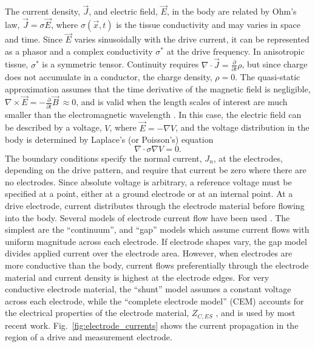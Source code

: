 \documentclass[12pt]{article} \usepackage[margin=3cm]{geometry} \usepackage[margin=20pt,font=small,labelfont=bf]{caption}\def\TBLWIDA{35mm}\def\TBLWIDB{95mm}
\newcommand\Fref[1]{Fig.\ \ref{#1}}
\newcommand{\JV}{\vec{J}}
\newcommand{\EV}{\vec{E}}
\newcommand{\BV}{\vec{B}}
\newcommand{\xV}{\vec{x}}
\begin{document}
The current density, $\JV$, and electric field, $\EV$,
in the body are related by Ohm's law, $\JV = \sigma \EV$,
where $\sigma(\xV, t)$ is the tissue conductivity
and may varies in space and time.
Since $\EV$ varies
sinusoidally with the drive current, it can be represented
as a phasor and a complex conductivity $\sigma^*$
at the drive frequency.
In anisotropic tissue, $\sigma^*$ is a symmetric tensor.
Continuity requires
$\nabla \cdot \JV = \frac{\partial}{\partial t}\rho$,
but since charge does not accumulate in a conductor,
 the charge density, $\rho=0$.
The quasi-static approximation assumes that the
time derivative of the magnetic field is negligible,
$\nabla \times \EV = -\frac{\partial}{\partial t}\BV ~\approx 0$,
and is valid when the length scales of interest are much
smaller than the electromagnetic wavelength \cite{Larsson2007Quasistatic}.
In this case, the electric field
 can be described by a voltage, $V$, where
$\EV = - \nabla  V$,
and the voltage distribution 
in the body is determined by 
Laplace's (or Poisson's) equation
\begin{equation}
 \nabla \cdot \sigma \nabla V = 0.
\label{eqn:LaplaceEqn}
\end{equation}
The boundary conditions specify the normal current, $J_n$, at the
electrodes, depending on the drive pattern, and require that current
be zero where there are no electrodes. Since absolute voltage
is arbitrary, a reference voltage must
be specified at a point, either at a ground electrode or 
at an internal point.
At a drive electrode, current distributes through
the electrode material before flowing into the body.
Several models of electrode current flow have been used
\cite{Cheney1999EIT}.
The simplest are the ``continuum'', and ``gap'' models  which assume
current flows with uniform magnitude across each electrode. If electrode
shapes vary, the gap model divides applied current over the electrode
area.  However, when electrodes
are more conductive than the body, 
current flows preferentially through the
electrode material and current density is highest at the
electrode edges. For very conductive electrode material, 
the ``shunt'' model assumes a constant voltage across
each electrode, while
the ``complete electrode model'' (CEM)
accounts for the electrical properties of the
electrode material, $Z_{C,ES}$ \cite{Cheng1989Complete}, and is used by
most recent work.
\Fref{fig:electrode_currents} shows the current propagation
in the region of a drive and measurement electrode.
\end{document}
